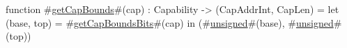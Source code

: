 function #\hyperref[sailRISCVzgetCapBounds]{getCapBounds}#(cap) : Capability -> (CapAddrInt, CapLen) =
  let (base, top) = #\hyperref[sailRISCVzgetCapBoundsBits]{getCapBoundsBits}#(cap) in
  (#\hyperref[sailRISCVzunsigned]{unsigned}#(base), #\hyperref[sailRISCVzunsigned]{unsigned}#(top))
